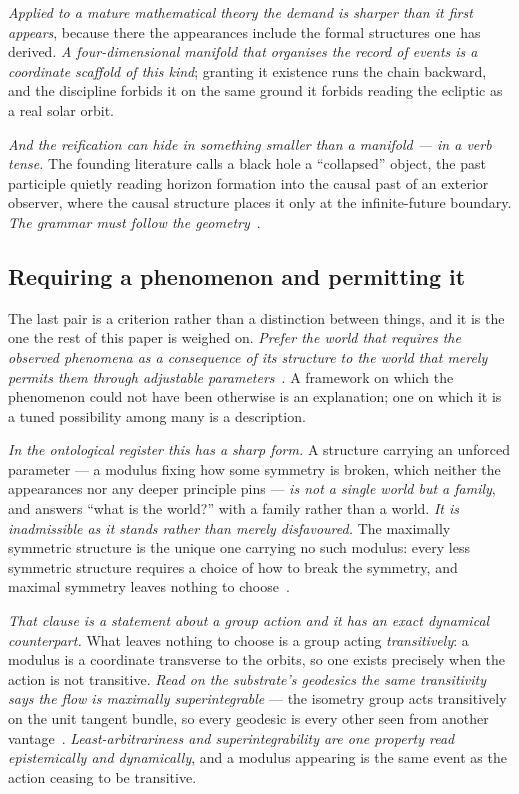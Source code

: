 \documentclass[11pt,a4paper]{article}
\theoremstyle{plain}
\theoremstyle{definition}
\begin{document}
\emph{Applied to a mature mathematical theory the demand is sharper than it first appears}, because there the
appearances include the formal structures one has derived. \emph{A four-dimensional manifold that organises
the record of events is a coordinate scaffold of this kind}; granting it existence runs the chain backward,
and the discipline forbids it on the same ground it forbids reading the ecliptic as a real solar orbit.

\emph{And the reification can hide in something smaller than a manifold --- in a verb tense.} The founding
literature calls a black hole a ``collapsed'' object, the past participle quietly reading horizon formation
into the causal past of an exterior observer, where the causal structure places it only at the infinite-future
boundary. \emph{The grammar must follow the geometry}~\cite{JanzenBHcausality}.

\subsection{Requiring a phenomenon and permitting it}

The last pair is a criterion rather than a distinction between things, and it is the one the rest of this
paper is weighed on. \emph{Prefer the world that requires the observed phenomena as a consequence of its
structure to the world that merely permits them through adjustable
parameters}~\cite{JanzenShadowExistence}. A framework on which the phenomenon could not have been otherwise is
an explanation; one on which it is a tuned possibility among many is a description.

\emph{In the ontological register this has a sharp form.} A structure carrying an unforced parameter --- a
modulus fixing how some symmetry is broken, which neither the appearances nor any deeper principle pins ---
\emph{is not a single world but a family}, and answers ``what is the world?'' with a family rather than a
world. \emph{It is inadmissible as it stands rather than merely disfavoured.} The maximally symmetric
structure is the unique one carrying no such modulus: every less symmetric structure requires a choice of how
to break the symmetry, and maximal symmetry leaves nothing to choose~\cite{JanzenShadowExistence}.

\emph{That clause is a statement about a group action and it has an exact dynamical counterpart.} What leaves
nothing to choose is a group acting \emph{transitively}: a modulus is a coordinate transverse to the orbits,
so one exists precisely when the action is not transitive. \emph{Read on the substrate's geodesics the same
transitivity says the flow is maximally superintegrable} --- the isometry group acts transitively on the unit
tangent bundle, so every geodesic is every other seen from another vantage~\cite{JanzenGeometricCore}.
\emph{Least-arbitrariness and superintegrability are one property read epistemically and dynamically}, and a
modulus appearing is the same event as the action ceasing to be transitive.
\end{document}
